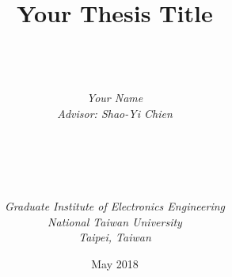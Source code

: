 \documentclass[a4paper, 12pt, twoside, openright]{mythesis}
\begin{document}
\title{\textbf{Your Thesis Title}}


\author{ \\  \\ \\
{\it Your Name}\\
{\it Advisor: Shao-Yi Chien} \\ \\ \\ \\  \\ \\
{\it Graduate Institute of Electronics Engineering}\\
{\it National Taiwan University} \\
{\it Taipei, Taiwan}\\ }

{\date{May 2018}}

\maketitle

\frontmatter

\tableofcontents
\listoffigures
\listoftables


\mainmatter







\end{document}
